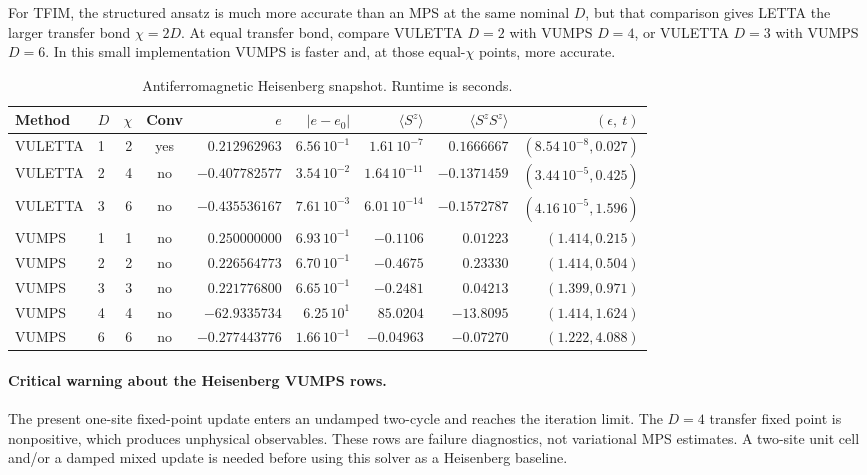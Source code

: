 \documentclass[11pt]{article}
\begin{document}
For TFIM, the structured ansatz is much more accurate than an MPS at the same
nominal $D$, but that comparison gives LETTA the larger transfer bond
$\chi=2D$.  At equal transfer bond, compare VULETTA $D=2$ with VUMPS
$D=4$, or VULETTA $D=3$ with VUMPS $D=6$.  In this small implementation
VUMPS is faster and, at those equal-$\chi$ points, more accurate.

\begin{table}[H]
  \centering
  \caption{Antiferromagnetic Heisenberg snapshot.  Runtime is seconds.}
  \label{tab:heisenberg-benchmark}
  \scriptsize
  \begin{tabular}{@{}llrcrrrrr@{}}
    \toprule
    Method & $D$ & $\chi$ & Conv & $e$ & $|e-e_0|$ &
      $\langle S^z\rangle$ & $\langle S^zS^z\rangle$ & $(\epsilon,\ t)$ \\
    \midrule
    VULETTA & 1 & 2 & yes & $0.212962963$ & $6.56\,10^{-1}$ &
      $1.61\,10^{-7}$ & $0.1666667$ & $(8.54\,10^{-8},0.027)$ \\
    VULETTA & 2 & 4 & no & $-0.407782577$ & $3.54\,10^{-2}$ &
      $1.64\,10^{-11}$ & $-0.1371459$ & $(3.44\,10^{-5},0.425)$ \\
    VULETTA & 3 & 6 & no & $-0.435536167$ & $7.61\,10^{-3}$ &
      $6.01\,10^{-14}$ & $-0.1572787$ & $(4.16\,10^{-5},1.596)$ \\
    \midrule
    VUMPS & 1 & 1 & no & $0.250000000$ & $6.93\,10^{-1}$ &
      $-0.1106$ & $0.01223$ & $(1.414,0.215)$ \\
    VUMPS & 2 & 2 & no & $0.226564773$ & $6.70\,10^{-1}$ &
      $-0.4675$ & $0.23330$ & $(1.414,0.504)$ \\
    VUMPS & 3 & 3 & no & $0.221776800$ & $6.65\,10^{-1}$ &
      $-0.2481$ & $0.04213$ & $(1.399,0.971)$ \\
    VUMPS & 4 & 4 & no & $-62.9335734$ & $6.25\,10^{1}$ &
      $85.0204$ & $-13.8095$ & $(1.414,1.624)$ \\
    VUMPS & 6 & 6 & no & $-0.277443776$ & $1.66\,10^{-1}$ &
      $-0.04963$ & $-0.07270$ & $(1.222,4.088)$ \\
    \bottomrule
  \end{tabular}
\end{table}

\paragraph{Critical warning about the Heisenberg VUMPS rows.}
The present one-site fixed-point update enters an undamped two-cycle and
reaches the iteration limit.  The $D=4$ transfer fixed point is nonpositive,
which produces unphysical observables.  These rows are failure diagnostics,
not variational MPS estimates.  A two-site unit cell and/or a damped mixed
update is needed before using this solver as a Heisenberg baseline.
\end{document}
